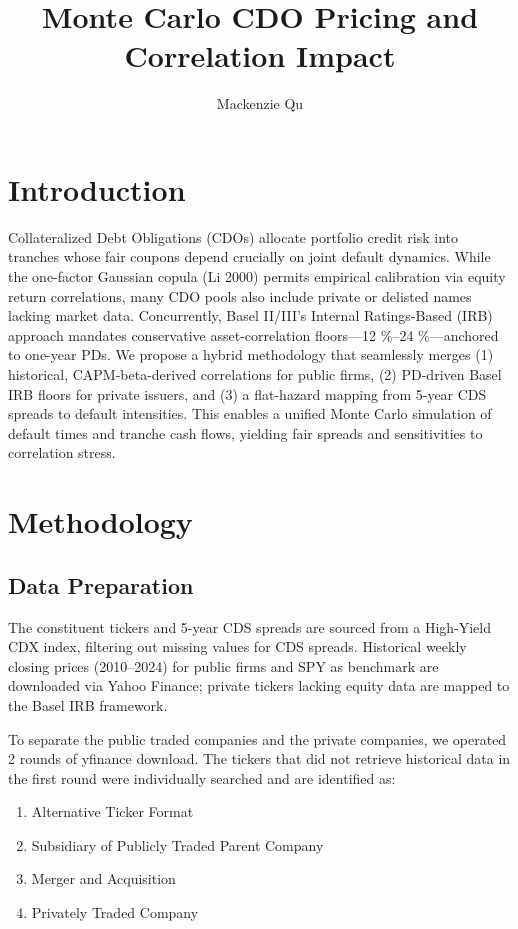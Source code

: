\documentclass[
	a4paper,         %
	12pt,            %
	unnumberedsections,  %
	twoside,         %
]{LTJournalArticle}
\title{
Monte Carlo CDO Pricing and Correlation Impact
}
\date{Mackenzie Qu} %
\begin{document}
\maketitle
\section{Introduction}
Collateralized Debt Obligations (CDOs) allocate portfolio credit risk into tranches whose fair coupons depend crucially on joint default dynamics.  While the one-factor Gaussian copula (Li 2000) permits empirical calibration via equity return correlations, many CDO pools also include private or delisted names lacking market data.  Concurrently, Basel II/III’s Internal Ratings-Based (IRB) approach mandates conservative asset-correlation floors—12 \%–24 \%—anchored to one-year PDs.  We propose a hybrid methodology that seamlessly merges (1) historical, CAPM-beta-derived correlations for public firms, (2) PD-driven Basel IRB floors for private issuers, and (3) a flat-hazard mapping from 5-year CDS spreads to default intensities.  This enables a unified Monte Carlo simulation of default times and tranche cash flows, yielding fair spreads and sensitivities to correlation stress.


\section{Methodology}
\subsection{Data Preparation} The constituent tickers and 5-year CDS spreads are sourced from a High-Yield CDX index, filtering out missing values for CDS spreads. Historical weekly closing prices (2010–2024) for public firms and SPY as benchmark are downloaded via Yahoo Finance\cite{yfinance}; private tickers lacking equity data are mapped to the Basel IRB framework\cite{bcbs_irb_2005}.

To separate the public traded companies and the private companies, we operated 2 rounds of yfinance download. The tickers that did not retrieve historical data in the first round were individually searched and are identified as: 
\begin{enumerate}
    \item Alternative Ticker Format
    \item Subsidiary of Publicly Traded Parent Company
    \item Merger and Acquisition
    \item Privately Traded Company
\end{enumerate}
\end{document}
